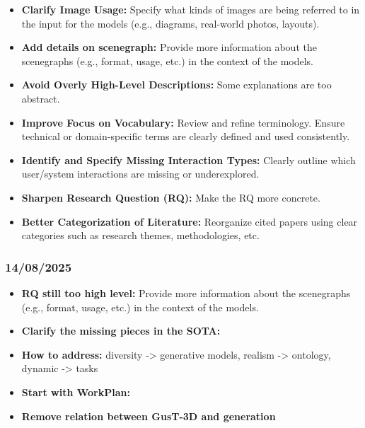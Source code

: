 \documentclass{article}
\begin{document}
\begin{itemize}
    \item \textbf{Clarify Image Usage:} Specify what kinds of images are being referred to in the input for the models (e.g., diagrams, real-world photos, layouts).
    
    \item \textbf{Add details on scenegraph:} Provide more information about the scenegraphs (e.g., format, usage, etc.) in the context of the models.
    
    \item \textbf{Avoid Overly High-Level Descriptions:} Some explanations are too abstract.
    
    \item \textbf{Improve Focus on Vocabulary:} Review and refine terminology. Ensure technical or domain-specific terms are clearly defined and used consistently.
    
    \item \textbf{Identify and Specify Missing Interaction Types:} Clearly outline which user/system interactions are missing or underexplored.
    
    \item \textbf{Sharpen Research Question (RQ):} Make the RQ more concrete.
    
    \item \textbf{Better Categorization of Literature:} Reorganize cited papers using clear categories such as research themes, methodologies, etc.
\end{itemize}

\subsubsection{14/08/2025}    

\begin{itemize}
    \item \textbf{RQ still too high level:} Provide more information about the scenegraphs (e.g., format, usage, etc.) in the context of the models.
    
    \item \textbf{Clarify the missing pieces in the SOTA:} 

    \item \textbf{How to address:} diversity -> generative models, realism -> ontology, dynamic -> tasks
    
    \item \textbf{Start with WorkPlan:}     
    
    \item \textbf{Remove relation between GusT-3D and generation}
\end{itemize}
\end{document}
